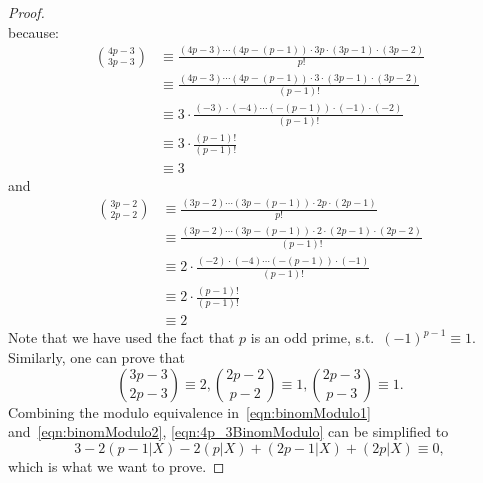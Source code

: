 \documentclass[12pt]{article}
\theoremstyle{definition}
\numberwithin{equation}{theorem}
\numberwithin{figure}{theorem}
\newcommand{\sothat}{s.t.\ }
\newcommand{\numSumSubset}[2]{\ensuremath{(#1|#2)}}
\begin{document}
\begin{proof}
\begin{equation}
        \end{equation}
        because:
        \begin{align*}
            \binom{4p-3}{3p-3} &\equiv \frac{(4p-3) \cdots (4p-(p-1)) \cdot 3p \cdot (3p-1) \cdot (3p-2)}{p!}\\
            &\equiv \frac{(4p-3) \cdots (4p-(p-1)) \cdot 3 \cdot (3p-1) \cdot (3p-2)}{(p-1)!} \\
            &\equiv 3 \cdot \frac{(-3) \cdot (-4) \cdots (-(p-1)) \cdot(-1)\cdot(-2)}{(p-1)!}\\
            &\equiv 3 \cdot \frac{(p-1)!}{(p-1)!}\\
            &\equiv 3
        \end{align*}        
        and
        \begin{align*}
            \binom{3p-2}{2p-2} &\equiv \frac{(3p-2) \cdots (3p-(p-1)) \cdot 2p \cdot (2p-1)}{p!}\\
            &\equiv \frac{(3p-2) \cdots (3p-(p-1)) \cdot 2 \cdot (2p-1) \cdot (2p-2)}{(p-1)!} \\
            &\equiv 2 \cdot \frac{(-2) \cdot (-4) \cdots (-(p-1)) \cdot(-1)}{(p-1)!}\\
            &\equiv 2 \cdot \frac{(p-1)!}{(p-1)!}\\
            &\equiv 2
        \end{align*}
        Note that we have used the fact that $p$ is an odd prime, \sothat $(-1)^{p-1} \equiv 1$.
        Similarly, one can prove that
        \begin{equation}\label{eqn:binomModulo2}
            \binom{3p-3}{2p-3}\equiv 2, \binom{2p-2}{p-2} \equiv 1, \binom{2p-3}{p-3}\equiv 1.
        \end{equation}
        Combining the modulo equivalence in~\eqref{eqn:binomModulo1} and~\eqref{eqn:binomModulo2}, \eqref{eqn:4p_3BinomModulo} can be simplified to
        \begin{equation}
            3 - 2\numSumSubset{p-1}{X} - 2\numSumSubset{p}{X} + \numSumSubset{2p-1}{X} + \numSumSubset{2p}{X} \equiv 0, 
        \end{equation}
        which is what we want to prove.
        \end{proof}
\end{document}

